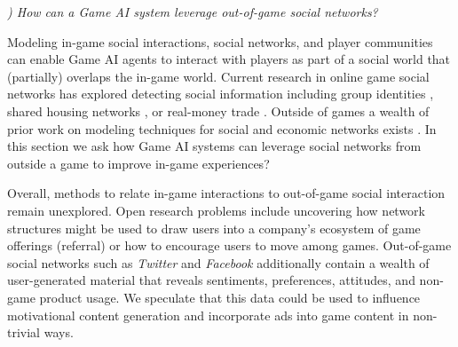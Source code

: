 \documentclass[conference]{IEEEtran}
\newcounter{questionno}
\newcommand{\subsubsectionx}[1]{{\em {\arabic{questionno}) #1}}
	\addtocounter{questionno}{1}
	}
\begin{document}


\subsubsectionx{How can a Game AI system leverage out-of-game social networks?}
%
Modeling in-game social interactions, social networks, and player communities can enable Game AI agents to interact with players as part of a social world that (partially) overlaps the in-game world. 
Current research in online game social networks has explored detecting social information including group identities \cite{grappiolo2013:group-identification}, shared housing networks \cite{ahmad2011:goldmining-hypergraph}, or real-money trade \cite{fujita2011:rmt-detect}. 
Outside of games a wealth of prior work on modeling techniques for social and economic networks exists \cite{jackson2010:soc-econ-networks}.
In this section we ask how Game AI systems can leverage social networks from outside a game to improve in-game experiences?

Overall, methods to relate in-game interactions to out-of-game social interaction remain unexplored.
Open research problems include uncovering how network structures might be used to draw users into a company's ecosystem of game offerings (referral) or how to encourage users to move among games.
Out-of-game social networks such as {\em Twitter} and {\em Facebook} additionally contain a wealth of user-generated material that reveals sentiments, preferences, attitudes, and non-game product usage.
We speculate that this data could be used to influence motivational content generation and incorporate ads into game content in non-trivial ways.
%
\end{document}
